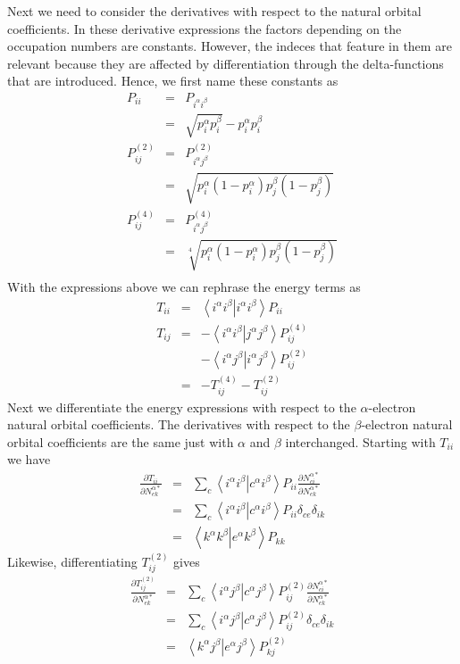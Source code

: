 \documentclass[pra]{revtex4-1}
\newcommand{\eria}[4]{\left\langle #1^\alpha #2^\beta \right.\left| #3^\alpha #4^\beta \right\rangle}
\begin{document}
Next we need to consider the derivatives with respect to the natural orbital
coefficients. In these derivative expressions the factors depending on the occupation
numbers are constants. However, the indeces that feature in them are relevant
because they are affected by differentiation through the delta-functions that are
introduced. Hence, we first name these constants as
\begin{eqnarray}
   P_{ii}
   &=& P_{i^\alpha i^\beta} \\
   &=& \sqrt{p_i^\alpha p_i^\beta} - p_i^\alpha p_i^\beta \\
   P^{(2)}_{ij}
   &=& P^{(2)}_{i^\alpha j^\beta} \\
   &=& \sqrt{p_i^\alpha(1-p_i^\alpha)p_j^\beta(1-p_j^\beta)} \\
   P^{(4)}_{ij}
   &=& P^{(4)}_{i^\alpha j^\beta} \\
   &=& \sqrt[4]{p_i^\alpha(1-p_i^\alpha)p_j^\beta(1-p_j^\beta)} \\
\end{eqnarray}
With the expressions above we can rephrase the energy terms as
\begin{eqnarray}
  T_{ii} 
  &=& \eria{i}{i}{i}{i}P_{ii} \\
  T_{ij}
  &=& -\eria{i}{i}{j}{j}P^{(4)}_{ij} \nonumber \\
  &&  -\eria{i}{j}{i}{j}P^{(2)}_{ij} \\
  &=& -T^{(4)}_{ij}-T^{(2)}_{ij}
\end{eqnarray}
Next we differentiate the energy expressions with respect to the $\alpha$-electron
natural orbital coefficients. The derivatives with respect to the $\beta$-electron
natural orbital coefficients are the same just with $\alpha$ and $\beta$ interchanged.
Starting with $T_{ii}$ we have
\begin{eqnarray}
   \frac{\partial T_{ii}}{\partial N^{\alpha*}_{ek}}
   &=& \sum_c \eria{i}{i}{c}{i}P_{ii}
       \frac{\partial N^{\alpha*}_{ci}}{\partial N^{\alpha*}_{ek}} \\
   &=& \sum_c \eria{i}{i}{c}{i}P_{ii}\delta_{ce}\delta_{ik} \\
   &=& \eria{k}{k}{e}{k}P_{kk}
\end{eqnarray}
Likewise, differentiating $T^{(2)}_{ij}$ gives
\begin{eqnarray}
   \frac{\partial T^{(2)}_{ij}}{\partial N^{\alpha*}_{ek}}
   &=& \sum_c\eria{i}{j}{c}{j}P^{(2)}_{ij}
       \frac{\partial N^{\alpha*}_{ci}}{\partial N^{\alpha*}_{ek}} \\
   &=& \sum_c\eria{i}{j}{c}{j}P^{(2)}_{ij}\delta_{ce}\delta_{ik} \\
   &=& \eria{k}{j}{e}{j}P^{(2)}_{kj}
\end{eqnarray}
\end{document}
